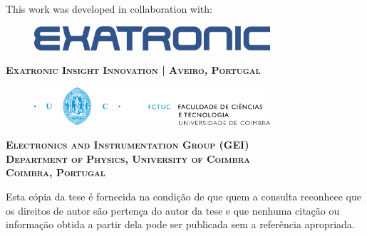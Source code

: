 \documentclass[11pt, oneside]{Thesis} %
\begin{document}

\begin{center}
This work was developed in collaboration with:\\[2cm]

\begin{figure}[htbp]
\centering
\includegraphics[width=0.78\textwidth]{Pictures/exa.png}\\[0.5cm]
\end{figure}

\textsc{\Large \bfseries Exatronic Insight Innovation | Aveiro, Portugal }\\[2cm]

 

\begin{figure}[htbp]
\centering
\includegraphics[width=0.78\textwidth]{Pictures/fctuc_logo.jpg} \\[0.5cm]
\end{figure} 

\textsc{\Large \bfseries Electronics and Instrumentation Group (GEI) \\ Department of Physics, University of Coimbra \\[0.2cm] Coimbra, Portugal }\\[2cm]






\end{center}



\clearpage



\null
\vfill

Esta cópia da tese é fornecida na condição de que quem a consulta reconhece
que os direitos de autor são pertença do autor da tese e que nenhuma citação ou
informação obtida a partir dela pode ser publicada sem a referência apropriada.
\end{document}
